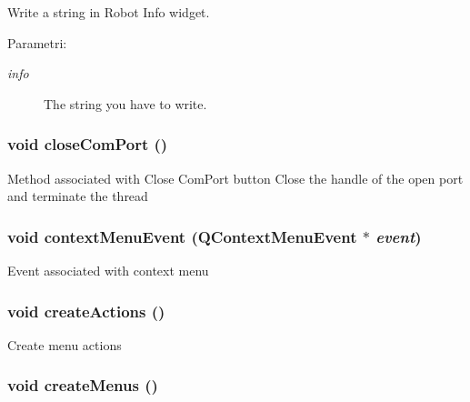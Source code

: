 Write a string in Robot Info widget. \begin{Desc}
\item[Parametri:]
\begin{description}
\item[{\em info}]The string you have to write. \end{description}
\end{Desc}
\hypertarget{classMainWindow_501f096e32ac1de50b0e913803bdd4e8}{
\subsubsection[closeComPort]{\setlength{\rightskip}{0pt plus 5cm}void close\-Com\-Port ()}}
\label{classMainWindow_501f096e32ac1de50b0e913803bdd4e8}


Method associated with Close Com\-Port button Close the handle of the open port and terminate the thread \hypertarget{classMainWindow_59701ebb47f7e2f55977543b6293ba47}{
\subsubsection[contextMenuEvent]{\setlength{\rightskip}{0pt plus 5cm}void context\-Menu\-Event (QContext\-Menu\-Event $\ast$ {\em event})}}
\label{classMainWindow_59701ebb47f7e2f55977543b6293ba47}


Event associated with context menu \hypertarget{classMainWindow_5176c9496a29e21eacb0f81ca1a29923}{
\subsubsection[createActions]{\setlength{\rightskip}{0pt plus 5cm}void create\-Actions ()}}
\label{classMainWindow_5176c9496a29e21eacb0f81ca1a29923}


Create menu actions \hypertarget{classMainWindow_5c788b6fcb676c3e1cef7e01eed9a420}{
\subsubsection[createMenus]{\setlength{\rightskip}{0pt plus 5cm}void create\-Menus ()}}
\label{classMainWindow_5c788b6fcb676c3e1cef7e01eed9a420}


